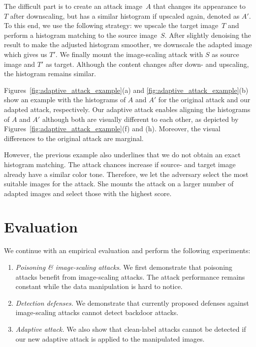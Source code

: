\documentclass[conference]{IEEEtran}
\newcommand{\srcimg}{\ensuremath{S}\xspace}
\newcommand{\tarimg}{\ensuremath{T}\xspace}
\newcommand{\attimg}{\ensuremath{A}\xspace}
\begin{document}
The {difficult\EndAccSupp{}} part is to create an attack image~\attimg that changes 
its appearance to~\tarimg after downscaling, but has a similar 
histogram if upscaled again, denoted as $\attimg'$.
To this end, we use the following strategy: we upscale the 
target image~\tarimg and perform a histogram matching to the source 
image~\srcimg. After slightly denoising the result to make the adjusted 
histogram smoother, we downscale the adapted image which gives us 
$\tarimg'$. We finally mount the image-scaling attack with \srcimg 
as source image and $\tarimg'$ as target. Although the content 
changes after down- and upscaling, the histogram remains similar.

Figures~\ref{fig:adaptive_attack_example}(a) and 
\ref{fig:adaptive_attack_example}(b) show an example with the 
histograms of $\attimg$ and $\attimg'$ for the original 
attack and our adapted attack, respectively. Our adaptive attack 
enables aligning the histograms of $\attimg$ and $\attimg'$ although 
both are visually different to each other, as depicted by
Figures~\ref{fig:adaptive_attack_example}(f) and (h). Moreover, the 
visual differences to the original attack are marginal.


However, the previous example also underlines that we do not obtain an 
exact histogram matching. The attack chances increase if source- and 
target image already have a similar color tone. Therefore, we let the 
adversary select the most suitable images for the attack. She mounts 
the attack on a larger number of adapted images and select those with 
the highest score.


\section{Evaluation}\label{sec:eval}
We continue with an empirical evaluation and perform the 
following {experiments\EndAccSupp{}}:
\begin{enumerate} \setlength{\itemsep}{2pt}
	\item \emph{Poisoning \& image-scaling attacks}. We first 
	demonstrate that poisoning attacks benefit from image-scaling 
	attacks. The attack performance remains constant while the data 
	manipulation is hard to notice.
	\item \emph{Detection defenses.} We demonstrate that currently 
	proposed defenses against image-scaling attacks cannot detect
	backdoor attacks.
	\item \emph{Adaptive attack.} We also show that clean-label attacks 
	cannot be detected if our new adaptive attack is applied to the 
	manipulated images.
	
\end{enumerate}
\end{document}
